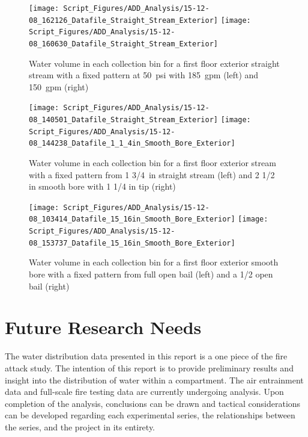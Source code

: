 \documentclass{article}
\begin{document}
\begin{figure}[ht]
\texttt{[image: Script\_Figures/ADD\_Analysis/15-12-08\_162126\_Datafile\_Straight\_Stream\_Exterior]}
\texttt{[image: Script\_Figures/ADD\_Analysis/15-12-08\_160630\_Datafile\_Straight\_Stream\_Exterior]} \\ 
\caption{Water volume in each collection bin for a first floor exterior straight stream with a fixed pattern at 50~psi with 185~gpm (left) and 150~gpm (right)}
\label{fig:Exterior_First_Floor_Varying_Nozzle_Pressure_SS_Fixed_Pattern}
\end{figure}

\begin{figure}[ht]
\texttt{[image: Script\_Figures/ADD\_Analysis/15-12-08\_140501\_Datafile\_Straight\_Stream\_Exterior]}
\texttt{[image: Script\_Figures/ADD\_Analysis/15-12-08\_144238\_Datafile\_1\_1\_4in\_Smooth\_Bore\_Exterior]} \\ 
\caption{Water volume in each collection bin for a first floor exterior stream with a fixed pattern from 1 3/4~in straight stream (left) and 2 1/2 in smooth bore with 1 1/4 in tip (right)}
\label{fig:Exterior_First_Floor_Varying_Hose_Size}
\end{figure}

\begin{figure}[ht]
\texttt{[image: Script\_Figures/ADD\_Analysis/15-12-08\_103414\_Datafile\_15\_16in\_Smooth\_Bore\_Exterior]}
\texttt{[image: Script\_Figures/ADD\_Analysis/15-12-08\_153737\_Datafile\_15\_16in\_Smooth\_Bore\_Exterior]} \\ 
\caption{Water volume in each collection bin for a first floor exterior smooth bore with a fixed pattern from full open bail (left) and a 1/2 open bail (right)}
\label{fig:Exterior_First_Floor_Varying_Bail}
\end{figure}



\section{Future Research Needs}

The water distribution data presented in this report is a one piece of the fire attack study. The intention of this report is to provide preliminary results and insight into the distribution of water within a compartment. The air entrainment data and full-scale fire testing data are currently undergoing analysis. Upon completion of the analysis, conclusions can be drawn and tactical considerations can be developed regarding each experimental series, the relationships between the series, and the project in its entirety.  
\end{document}
